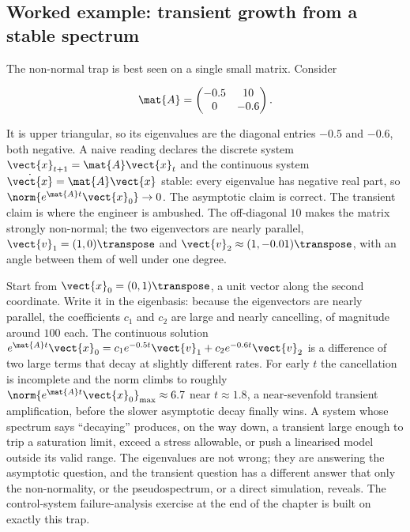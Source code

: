 \subsection{Worked example: transient growth from a stable spectrum}

The non-normal trap is best seen on a single small matrix. Consider

\[
\mat{A} = \begin{pmatrix} -0.5 & 10 \\ 0 & -0.6 \end{pmatrix}.
\]

It is upper triangular, so its eigenvalues are the diagonal entries
$-0.5$ and $-0.6$, both negative. A naive reading declares the
discrete system $\vect{x}_{t+1} = \mat{A} \vect{x}_{t}$ and the
continuous system $\dot{\vect{x}} = \mat{A} \vect{x}$ stable: every
eigenvalue has negative real part, so $\norm{e^{\mat{A}t}\vect{x}_{0}}
\to 0$. The asymptotic claim is correct. The transient claim is
where the engineer is ambushed. The off-diagonal $10$ makes the
matrix strongly non-normal; the two eigenvectors are nearly
parallel, $\vect{v}_{1} = (1, 0)\transpose$ and $\vect{v}_{2}
\approx (1, -0.01)\transpose$, with an angle between them of well
under one degree.

Start from $\vect{x}_{0} = (0, 1)\transpose$, a unit vector along
the second coordinate. Write it in the eigenbasis: because the
eigenvectors are nearly parallel, the coefficients $c_{1}$ and
$c_{2}$ are large and nearly cancelling, of magnitude around $100$
each. The continuous solution $e^{\mat{A}t}\vect{x}_{0} = c_{1}
e^{-0.5t}\vect{v}_{1} + c_{2}e^{-0.6t}\vect{v}_{2}$ is a difference
of two large terms that decay at slightly different rates. For early
$t$ the cancellation is incomplete and the norm climbs to roughly
$\norm{e^{\mat{A}t}\vect{x}_{0}}_{\max} \approx 6.7$ near $t \approx
1.8$, a near-sevenfold transient amplification, before the slower
asymptotic decay finally wins. A system whose spectrum says
``decaying'' produces, on the way down, a transient large enough to
trip a saturation limit, exceed a stress allowable, or push a
linearised model outside its valid range. The eigenvalues are not
wrong; they are answering the asymptotic question, and the transient
question has a different answer that only the non-normality, or the
pseudospectrum, or a direct simulation, reveals. The control-system
failure-analysis exercise at the end of the chapter is built on
exactly this trap.



